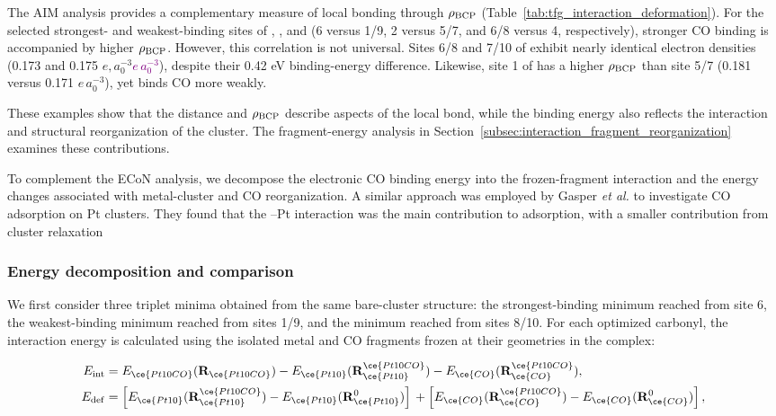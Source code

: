 The AIM analysis provides a complementary measure of local  bonding through $\rho_{\rm BCP}$ (Table~\ref{tab:tfg_interaction_deformation}). For the selected strongest- and weakest-binding sites of , , and  (6 versus 1/9, 2 versus 5/7, and 6/8 versus 4, respectively), stronger CO binding is accompanied by higher $\rho_{\rm BCP}$. However, this correlation is not universal. Sites 6/8 and 7/10 of  exhibit nearly identical electron densities (0.173 and 0.175 \sout{$e,a_0^{-3}$}\textcolor{purple}{$e\,a_0^{-3}$}), despite their 0.42 eV binding-energy difference. Likewise, site 1 of  has a higher $\rho_{\rm BCP}$ than site 5/7 (0.181 versus 0.171 {$e\,a_0^{-3}$}), yet binds CO more weakly.

These examples show that the  distance and $\rho_{\rm BCP}$ describe aspects of the local bond, while the binding energy also reflects the interaction and structural reorganization of the cluster. The fragment-energy analysis in Section~\ref{subsec:interaction_fragment_reorganization} examines these contributions.



To complement the ECoN analysis, we decompose the electronic CO binding energy
into the frozen-fragment interaction and the energy changes associated with
metal-cluster and CO reorganization. A similar approach was employed by Gasper
\textit{et al.} to investigate CO adsorption on Pt clusters. They found that the --Pt interaction was the
main contribution to adsorption, with a smaller contribution from
cluster relaxation\cite{gasper:2017}

\subsubsection{Energy decomposition and  comparison}

We first consider three triplet  minima obtained from the same
bare-cluster structure: the strongest-binding minimum reached from site 6, the
weakest-binding minimum reached from sites 1/9, and the minimum reached from
sites 8/10. For each optimized carbonyl, the interaction energy is calculated using the isolated metal and CO fragments frozen at their geometries in the complex:

\begin{align}
E_{\mathrm{int}} &=
E_{\ce{Pt10CO}}(\mathbf R_{\ce{Pt10CO}})
-E_{\ce{Pt10}}(\mathbf R_{\ce{Pt10}}^{\ce{Pt10CO}})
-E_{\ce{CO}}(\mathbf R_{\ce{CO}}^{\ce{Pt10CO}}),\\
E_{\mathrm{def}} &=
\left[
E_{\ce{Pt10}}(\mathbf R_{\ce{Pt10}}^{\ce{Pt10CO}})
-E_{\ce{Pt10}}(\mathbf R_{\ce{Pt10}}^{0})
\right]
{}+
\left[
E_{\ce{CO}}(\mathbf R_{\ce{CO}}^{\ce{Pt10CO}})
-E_{\ce{CO}}(\mathbf R_{\ce{CO}}^{0})
\right],
\label{eq:tfg_deformation}
\end{align}

